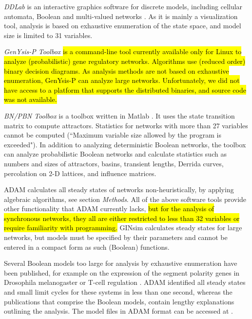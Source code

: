 \documentclass[10pt]{bmc_article}
\newenvironment{bmcformat}{\begin{raggedright}\baselineskip20pt\sloppy\setboolean{publ}{false}}{\end{raggedright}\baselineskip20pt\sloppy}
\begin{document}
\begin{bmcformat}
{\it DDLab} is an interactive graphics software for discrete models, including
cellular automata, Boolean and multi-valued networks \cite{DDLab}. As it is
mainly a visualization tool, analysis is based on exhaustive enumeration of
the state space, and model size is limited to 31 variables.  

{\it GenYsis-P Toolbox} \hl{is a command-line tool currently available only for Linux to analyze (probabilistic) gene regulatory networks. Algorithms use (reduced order) binary decision diagrams. As analysis methods are not based on exhaustive enumeration, GenYsis-P can analyze large networks. Unfortunately, we did not have access to a platform that supports the distributed binaries, and source code was not available. }


{\it BN/PBN Toolbox} is a toolbox written in Matlab \cite{shmulevich-matlab}.
It uses the state transition matrix to compute attractors. Statistics for
networks with more than 27 variables cannot be computed (``Maximum variable
size allowed by the program is exceeded"). In addition to analyzing
deterministic Boolean networks, the toolbox can analyze probabilistic Boolean
networks and calculate statistics such as numbers and sizes of attractors,
basins, transient lengths, Derrida curves, percolation on 2-D lattices, and
influence matrices. 

ADAM calculates all steady states of networks
non-heuristically, by applying algebraic algorithms, see section {\it Methods}. All of the above software
tools provide other functionality that ADAM currently lacks, \hl{but for the analysis of synchronous networks, they all are either restricted to less than 32 variables or require familiarity with programming.} GINsim calculates steady states for large networks, but models must
be specified by their parameters and cannot be entered in a compact form as such
(Boolean) functions.

Several Boolean models too large for analysis by exhaustive enumeration have been published, 
for example on the expression of the segment polarity genes in Drosophila
melanogaster or T-cell regulation
\cite{AO,Pedicini-Tcell}. ADAM identified all steady states and small limit cycles
for these systems
in less than one second, whereas the publications that comprise the Boolean models, contain lengthy explanations outlining the analysis. The model files in ADAM format can be accessed at
\cite{ADAMRepo}. 



\end{bmcformat}
\end{document}
